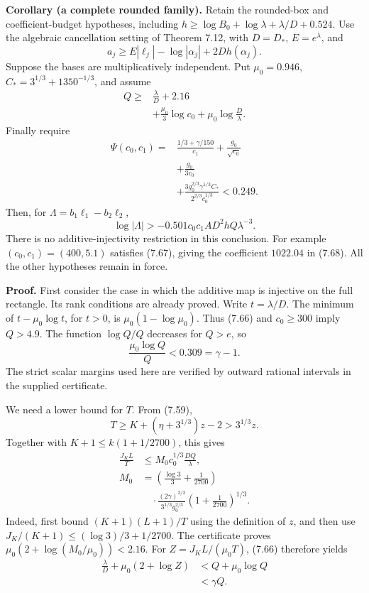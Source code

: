 \documentclass[
  11pt,
  a4paper,
]{article}
\begin{document}
\textbf{Corollary (a complete rounded family).} Retain the rounded-box
and coefficient-budget hypotheses, including
\(h\ge\log B_0+\log\lambda+\lambda/D+0.524\). Use the algebraic
cancellation setting of Theorem 7.12, with \(D=D_*\), \(E=e^\lambda\),
and \[
a_j\ge E|\ell_j|-\log|\alpha_j|+2Dh(\alpha_j).
\] Suppose the bases are multiplicatively independent. Put
\(\mu_0=0.946\), \(C_*=3^{1/3}+1350^{-1/3}\), and assume \[
\begin{aligned}
Q\ge{}&\frac\lambda D+2.16\\
&+\frac{\mu_0}{3}\log c_0
+\mu_0\log\frac D\lambda.
\end{aligned} \tag{7.66}
\] Finally require \[
\begin{aligned}
\Psi(c_0,c_1)={}&\frac{1/3+\gamma/150}{c_1}
+\frac{g_0}{\sqrt{c_0}}\\
&+\frac{g_0}{3c_0}\\
&+\frac{3g_0^{2/3}\gamma^{1/3}C_*}
             {2^{2/3}c_0^{1/3}}
<0.249.
\end{aligned} \tag{7.67}
\] Then, for \(\Lambda=b_1\ell_1-b_2\ell_2\), \[
\log|\Lambda|>
-0.501c_0c_1AD^2hQ\lambda^{-3}. \tag{7.68}
\] There is no additive-injectivity restriction in this conclusion. For
example \((c_0,c_1)=(400,5.1)\) satisfies (7.67), giving the coefficient
\(1022.04\) in (7.68). All the other hypotheses remain in force.

\textbf{Proof.} First consider the case in which the additive map is
injective on the full rectangle. Its rank conditions are already proved.
Write \(t=\lambda/D\). The minimum of \(t-\mu_0\log t\), for \(t>0\), is
\(\mu_0(1-\log\mu_0)\). Thus (7.66) and \(c_0\ge300\) imply \(Q>4.9\).
The function \(\log Q/Q\) decreases for \(Q>e\), so \[
\frac{\mu_0\log Q}{Q}<0.309=\gamma-1.
\] The strict scalar margins used here are verified by outward rational
intervals in the supplied certificate.

We need a lower bound for \(T\). From (7.59), \[
T\ge K+(\eta+3^{1/3})z-2>3^{1/3}z.
\] Together with \(K+1\le k(1+1/2700)\), this gives \[
\begin{aligned}
\frac{J_KL}{T}&\le M_0c_0^{1/3}\frac{DQ}{\lambda},\\
M_0&=\left(\frac{\log3}{3}+\frac1{2700}\right)\\
&\quad\cdot\frac{(2\gamma)^{2/3}}{3^{1/3}g_0^{2/3}}
\left(1+\frac1{2700}\right)^{1/3}.
\end{aligned}
\] Indeed, first bound \((K+1)(L+1)/T\) using the definition of \(z\),
and then use \(J_K/(K+1)\le(\log3)/3+1/2700\). The certificate proves
\(\mu_0(2+\log(M_0/\mu_0))<2.16\). For \(Z=J_KL/(\mu_0T)\), (7.66)
therefore yields \[
\begin{aligned}
\frac\lambda D+\mu_0(2+\log Z)
&<Q+\mu_0\log Q\\
&<\gamma Q.
\end{aligned} \tag{7.69}
\]
\end{document}
